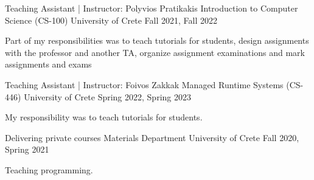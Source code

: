 


\begin{cventries}

  \cventry
    {Teaching Assistant | Instructor: Polyvios Pratikakis} %
    {Introduction to Computer Science (CS-100)} %
    {University of Crete} %
    {Fall 2021, Fall 2022} %
    {
      \begin{cvitems} %
        \item{Part of my responsibilities was to teach tutorials for
            students, design assignments with the professor and
              another TA, organize assignment examinations
	      and mark assignments and exams}
      \end{cvitems}
    }

  \cventry
    {Teaching Assistant | Instructor: Foivos Zakkak} %
    {Managed Runtime Systems (CS-446)} %
    {University of Crete} %
    {Spring 2022, Spring 2023} %
    {
      \begin{cvitems} %
        \item{My responsibility was to teach tutorials for
            students.}
      \end{cvitems}
    }


  \cventry
    {Delivering private courses} %
    {Materials Department} %
    {University of Crete} %
    {Fall 2020, Spring 2021} %
    {
      \begin{cvitems}
        \item{Teaching programming.}
      \end{cvitems}
    }

\end{cventries}
